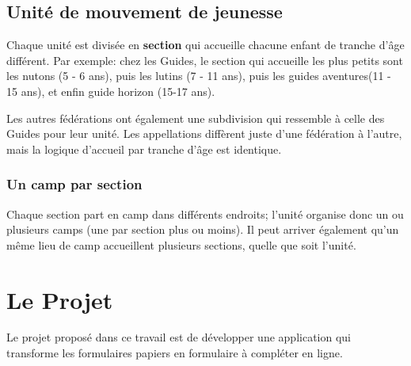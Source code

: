 \subsection{Unité de mouvement de jeunesse}
Chaque unité est divisée en \textbf{section }qui accueille chacune enfant de tranche d'âge différent. Par exemple: chez les Guides, le section qui accueille les plus petits sont les nutons (5 - 6 ans), puis les lutins (7 - 11 ans), puis les guides aventures(11 - 15 ans), et enfin guide horizon (15-17 ans). 

Les autres fédérations ont également une subdivision qui ressemble à celle des Guides pour leur unité. Les appellations diffèrent juste d'une fédération à l'autre, mais la logique d'accueil par tranche d'âge est identique. 

\subsubsection{Un camp par section}
Chaque section part en camp dans différents endroits; l'unité organise donc un ou plusieurs camps (une par section plus ou moins). Il peut arriver également qu'un même lieu de camp accueillent plusieurs sections, quelle que soit l'unité. 


	
\section{Le Projet}
Le projet proposé dans ce travail est de développer une application qui transforme les formulaires papiers en formulaire à compléter en ligne. 


